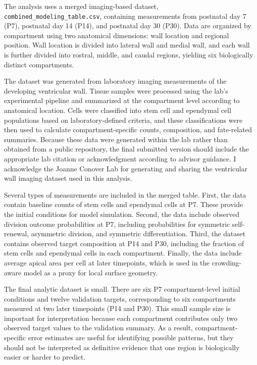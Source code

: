\documentclass[12pt]{article}
\begin{document}
The analysis uses a merged imaging-based dataset, \texttt{combined\_modeling\_table.csv}, containing measurements from postnatal day 7 (P7), postnatal day 14 (P14), and postnatal day 30 (P30). Data are organized by compartment using two anatomical dimensions: wall location and regional position. Wall location is divided into lateral wall and medial wall, and each wall is further divided into rostral, middle, and caudal regions, yielding six biologically distinct compartments.

The dataset was generated from laboratory imaging measurements of the developing ventricular wall. Tissue samples were processed using the lab's experimental pipeline and summarized at the compartment level according to anatomical location. Cells were classified into stem cell and ependymal cell populations based on laboratory-defined criteria, and these classifications were then used to calculate compartment-specific counts, composition, and fate-related summaries. Because these data were generated within the lab rather than obtained from a public repository, the final submitted version should include the appropriate lab citation or acknowledgment according to advisor guidance. I acknowledge the Joanne Conover Lab for generating and sharing the ventricular wall imaging dataset used in this analysis.

Several types of measurements are included in the merged table. First, the data contain baseline counts of stem cells and ependymal cells at P7. These provide the initial conditions for model simulation. Second, the data include observed division outcome probabilities at P7, including probabilities for symmetric self-renewal, asymmetric division, and symmetric differentiation. Third, the dataset contains observed target composition at P14 and P30, including the fraction of stem cells and ependymal cells in each compartment. Finally, the data include average apical area per cell at later timepoints, which is used in the crowding-aware model as a proxy for local surface geometry.

The final analytic dataset is small. There are six P7 compartment-level initial conditions and twelve validation targets, corresponding to six compartments measured at two later timepoints (P14 and P30). This small sample size is important for interpretation because each compartment contributes only two observed target values to the validation summary. As a result, compartment-specific error estimates are useful for identifying possible patterns, but they should not be interpreted as definitive evidence that one region is biologically easier or harder to predict.
\end{document}
